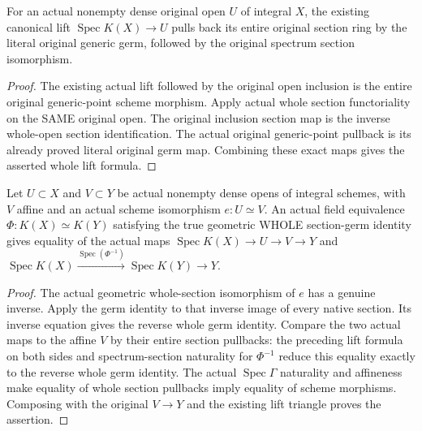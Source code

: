 \begin{lemma}
\label{lem:seven-dense-original-generic-lift-whole-sections-route}
\leanok
{}
For an actual nonempty dense original open $U$ of integral $X$, the existing
canonical lift $\operatorname{Spec}K(X)\to U$ pulls back its entire original
section ring by the literal original generic germ, followed by the original
spectrum section isomorphism.
\end{lemma}
\begin{proof}
The existing actual lift followed by the original open inclusion is the
entire original generic-point scheme morphism. Apply actual whole section
functoriality on the SAME original open. The original inclusion section map
is the inverse whole-open section identification. The actual original
generic-point pullback is its already proved literal original germ map.
Combining these exact maps gives the asserted whole lift formula.
\end{proof}

\begin{lemma}
\label{lem:seven-actual-chart-germs-to-generic-scheme-triangle-route}
\leanok
{}
Let $U\subset X$ and $V\subset Y$ be actual nonempty dense opens of integral
schemes, with $V$ affine and an actual scheme isomorphism $e:U\simeq V$.
An actual field equivalence $\Phi:K(X)\simeq K(Y)$ satisfying the true
geometric WHOLE section-germ identity gives equality of the actual maps
$\operatorname{Spec}K(X)\to U\to V\to Y$ and
$\operatorname{Spec}K(X)\xrightarrow{\operatorname{Spec}(\Phi^{-1})}
\operatorname{Spec}K(Y)\to Y$.
\end{lemma}
\begin{proof}
The actual geometric whole-section isomorphism of $e$ has a genuine inverse.
Apply the germ identity to that inverse image of every native section. Its
inverse equation gives the reverse whole germ identity. Compare the two
actual maps to the affine $V$ by their entire section pullbacks: the preceding
lift formula on both sides and spectrum-section naturality for $\Phi^{-1}$
reduce this equality exactly to the reverse whole germ identity. The actual
$\operatorname{Spec}\Gamma$ naturality and affineness make equality of whole
section pullbacks imply equality of scheme morphisms. Composing with the
original $V\to Y$ and the existing lift triangle proves the assertion.
\end{proof}

